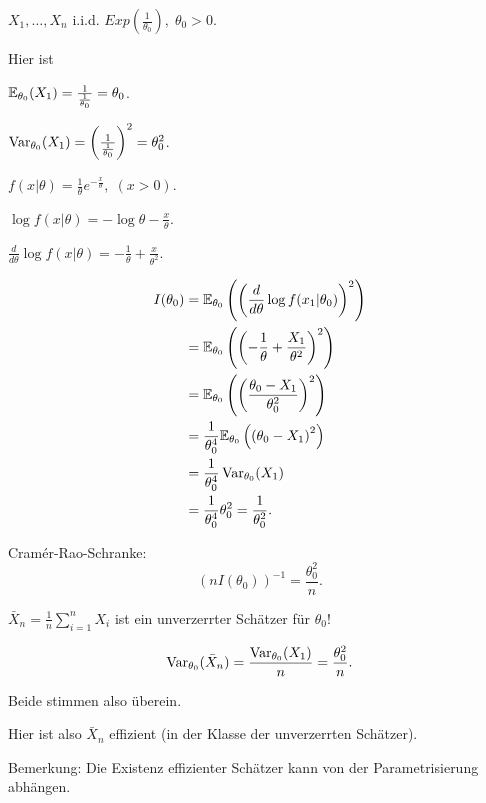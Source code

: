 \documentclass{tstextbook}
\begin{document}
\begin{example}
	$ X_1,\ldots,X_n $ i.i.d. $ Exp\left(\frac{1}{\theta_0}\right), \; \theta_0 > 0 $. 
	
	Hier ist
	
	$ \mathbb E_{\theta_0}(X_1) = \frac{1}{\frac{1}{\theta_0}} = \theta_0 $.
	
	$ \operatorname{Var}_{\theta_0} (X_1)  = \left(\frac{1}{\frac{1}{\theta_0}}\right)^2 = \theta_0^2 $.
	
	$ f(x|\theta) = \frac{1}{\theta} e^{-\frac{x}{\theta}}, \; (x > 0) $. 
	
	$ \log f(x|\theta) = -\log \theta -  \frac{x}{\theta} $. 
	
	$ \frac{d}{d\theta} \log f(x|\theta) = -\frac{1}{\theta} + \frac{x}{\theta^2} $. 
	
	\[
	\begin{aligned}
		I(\theta_0) & = \mathbb E_{\theta_0} \left(\left(\frac{d}{d\theta}\log f(x_1|\theta_0)\right)^2\right) \\
		& = \mathbb E_{\theta_0} \left(\left(-\frac{1}{\theta} + \frac{X_1}{\theta^2}\right)^2\right) \\
		& = \mathbb E_{\theta_0} \left(\left(\frac{\theta_0-X_1}{\theta_0^2}\right)^2\right) \\
		& = \frac{1}{\theta_0^4}\mathbb E_{\theta_0} \left(\left(\theta_0-X_1\right)^2\right) \\
		& =\frac{1}{\theta_0^4} \operatorname{Var}_{\theta_0}(X_1) \\
		& = \frac{1}{\theta_0^4}\theta_0^2  = \frac{1}{\theta_0^2}.
	\end{aligned}
	\]
	
	Cramér-Rao-Schranke: 
	\[
	(nI(\theta_0))^{-1} = \frac{\theta_0^2}{n}.
	\]
	
	$ \bar{X}_n = \frac{1}{n}\sum_{i=1}^{n}X_i $ ist ein unverzerrter Schätzer für $ \theta_0 $!
	
	\[
	\operatorname{Var}_{\theta_0}(\bar{X}_n) = \frac{\operatorname{Var}_{\theta_0}(X_1)}{n} = \frac{\theta_0^2}{n}.
	\]
	
	Beide stimmen also überein. 
	
	Hier ist also $ \bar{X}_n $ effizient (in der Klasse der unverzerrten Schätzer). 
\end{example}

\begin{remark}
	Bemerkung: Die Existenz effizienter Schätzer kann von der Parametrisierung abhängen.
\end{remark}
\end{document}
